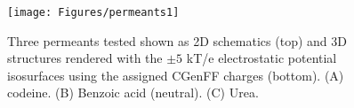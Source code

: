 \begin{figure}[htbp]
\begin{center}
	\texttt{[image: Figures/permeants1]}
	\caption{Three permeants tested shown as 2D schematics (top) and 3D structures rendered with the $\pm 5$ kT/e electrostatic potential isosurfaces
using the assigned CGenFF charges (bottom).  (A) codeine.  (B) Benzoic acid (neutral).  (C) Urea.}
	\label{fig:permeants}
\end{center}
\end{figure}

